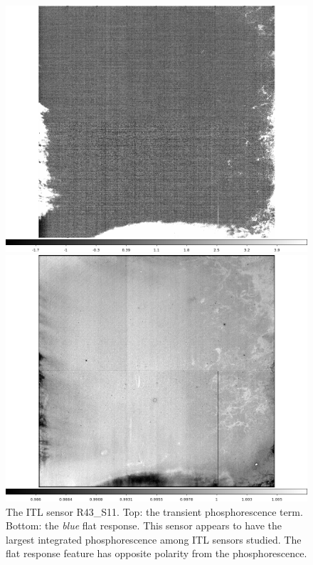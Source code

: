 \begin{figure}[!htbp]
\centering
\begin{minipage}{1.0\textwidth}    
  \centering
  \includegraphics[width=.6\linewidth]{figures/phosphorescence-survey/stains_phos_R43_S11.png}    
\end{minipage}
\begin{minipage}{1.0\textwidth}
  \centering
  \includegraphics[width=.6\linewidth]{figures/phosphorescence-survey/stains_abs_R43_S11.png}
\end{minipage}
\caption{The ITL sensor R43\_S11. Top: the transient phosphorescence term. Bottom: the {\it blue} flat response. This sensor appears to have the largest integrated phosphorescence among ITL sensors studied. The flat response feature has opposite polarity from the phosphorescence.}
\label{fig:phos:stains:R43S11}
\end{figure}


